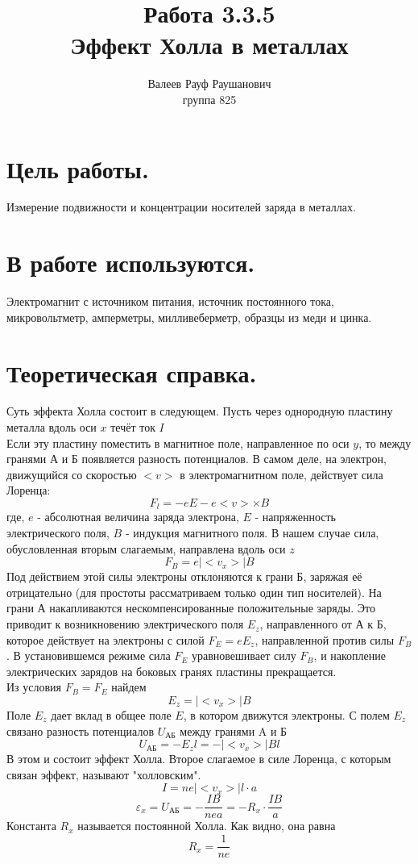 \documentclass[a4paper, 12pt]{article}%
\author{Валеев Рауф Раушанович \\
группа 825}
\title{\textbf{Работа 3.3.5\\
Эффект Холла в металлах}}
\begin{document}
\maketitle
\newpage
\section*{Цель работы.}
Измерение подвижности и концентрации носителей заряда в металлах.\\
\section*{В работе используются.}
Электромагнит с источником питания, источник постоянного тока, микровольтметр, амперметры, милливеберметр, образцы из меди и цинка. 
\section*{Теоретическая справка.}
Суть эффекта Холла состоит в следующем. Пусть через однородную пластину металла вдоль оси $x$ течёт ток $I$\\
Если эту пластину поместить в магнитное поле, направленное по оси $y$, то между гранями А и Б появляется разность потенциалов. В самом деле, на электрон, движущийся со скоростью $<v>$ в электромагнитном поле, действует сила Лоренца: 
\begin{equation}
F_l = -eE - e<v> \times B
\end{equation}
где, $e$ - абсолютная величина заряда электрона, $E$ - напряженность электрического поля, $B$ - индукция магнитного поля. 
В нашем случае сила, обусловленная вторым слагаемым, направлена вдоль оси $z$
\[F_B = e |<v_x>|B\]
Под действием этой силы электроны отклоняются к грани Б, заряжая её отрицательно (для простоты рассматриваем только один тип носителей). На грани А накапливаются нескомпенсированные положительные заряды. Это приводит к возникновению электрического поля $E_z$, направленного от А к Б, которое действует на электроны с силой $F_E = e E_z$, направленной против силы $F_B$. В установившемся режиме сила $F_E$ уравновешивает силу $F_B$, и накопление электрических зарядов на боковых гранях пластины прекращается.\\
Из условия $F_B = F_E$ найдем 
\begin{equation}
E_z = |<v_x>|B
\end{equation}
Поле $E_z$ дает вклад в общее поле $E$, в котором движутся электроны. С полем $E_z$ связано разность потенциалов $U_{\text{АБ}}$ между гранями A и Б
\begin{equation}
U_{\text{АБ}} = -E_z l = -|<v_x>|Bl
\end{equation}
В этом и состоит эффект Холла. Второе слагаемое в силе Лоренца, с которым связан эффект, называют "холловским".
\begin{equation}
I = ne|<v_x>|l \cdot a 
\end{equation}
\begin{equation}
\varepsilon_x = U_{\text{АБ}} = -\dfrac{IB}{nea} = -R_x \cdot \dfrac{IB}{a}
\end{equation}
Константа $R_x$ называется постоянной Холла. Как видно, она равна \begin{equation}
R_x = \dfrac{1}{ne}
\end{equation}
\end{document}
